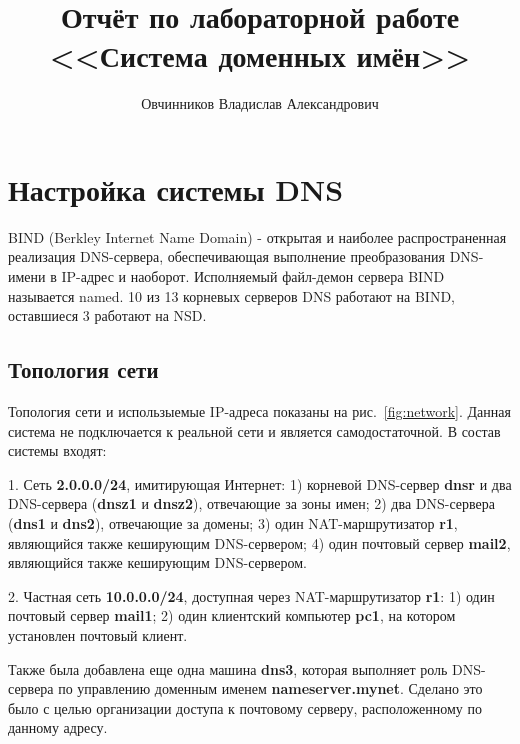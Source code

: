 \documentclass[a4paper,12pt]{article}
\title{Отчёт по лабораторной работе \\ <<Система доменных имён>>}
\author{Овчинников Владислав Александрович}
\begin{document}
\maketitle

\tableofcontents

\section{Настройка системы DNS}

BIND (Berkley Internet Name Domain) - открытая и наиболее распространенная реализация DNS-сервера, обеспечивающая выполнение преобразования DNS-имени в IP-адрес и наоборот. Исполняемый файл-демон сервера BIND называется named. 10 из 13 корневых серверов DNS работают на BIND, оставшиеся 3 работают на NSD.

\subsection{Топология сети}

Топология сети и использыемые IP-адреса показаны на рис.~\ref{fig:network}. Данная система не подключается к реальной сети и является самодостаточной. В состав системы входят:

1. Сеть \textbf{2.0.0.0/24}, имитирующая Интернет: 1) корневой DNS-сервер \textbf{dnsr} и два DNS-сервера (\textbf{dnsz1} и \textbf{dnsz2}), отвечающие за зоны имен; 2) два DNS-сервера (\textbf{dns1} и \textbf{dns2}), отвечающие за домены; 3) один NAT-маршрутизатор \textbf{r1}, являющийся также кеширующим DNS-сервером; 4) один почтовый сервер \textbf{mail2}, являющийся также кеширующим DNS-сервером.

2. Частная сеть \textbf{10.0.0.0/24}, доступная через NAT-маршрутизатор \textbf{r1}: 1) один почтовый сервер \textbf{mail1}; 2) один клиентский компьютер \textbf{pc1}, на котором установлен почтовый клиент.

Также была добавлена еще одна машина \textbf{dns3}, которая выполняет роль DNS-сервера по управлению доменным именем \textbf{nameserver.mynet}. Сделано это было с целью организации доступа к почтовому серверу, расположенному по данному адресу.
\end{document}

